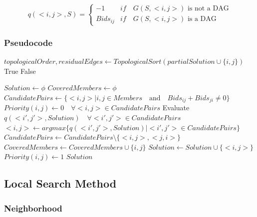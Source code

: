 \documentclass{article}
\begin{document}
\begin{displaymath}
    q(<i,j>, S) = \begin{cases}
    -1 & if \quad G(S, <i,j>) \textrm{ is not a DAG}\\
    Bids_{ij} & if \quad G(S, <i,j>) \textrm{ is a DAG}
    \end{cases}
\end{displaymath}

\subsubsection{Pseudocode}

\begin{algorithm}[H]
\renewcommand{\thealgorithm}{}
\caption{Greedy Algorithm}
\begin{algorithmic}

\State $topologicalOrder, residualEdges \gets TopologicalSort(partialSolution \cup \{{i,j}\})$
\State \Return True
\Else
\State \Return False
\EndIf
\EndFunction

\Statex

\State $Solution \gets \phi$
\State $CoveredMembers \gets \phi$
\State $CandidatePairs \gets \{<i,j> \mid i,j \in Members \quad \textrm{and} \quad Bids_{ij} + Bids_{ji} \neq 0\}$
\State $Priority(i,j) \gets 0 \quad \forall <i,j> \in CandidatePairs$
    \State Evaluate $q(<i',j'>, Solution) \quad \forall <i',j'> \in CandidatePairs$
    \State $<i,j> \gets argmax\{q(<i', j'>, Solution)\lvert <i', j'> \in CandidatePairs \}$
    \State $CandidatePairs \gets CandidatePairs \setminus \{<i,j>, <j,i>\}$
    \State $CoveredMembers \gets CoveredMembers \cup \{i,j\}$
    \State $Solution \gets Solution \cup \{<i,j>\}$
    \State $Priority(i,j) \gets 1$
\EndWhile
\State \Return $Solution$

\end{algorithmic}
\end{algorithm}

\subsection{Local Search Method}

\subsubsection{Neighborhood}
\end{document}
